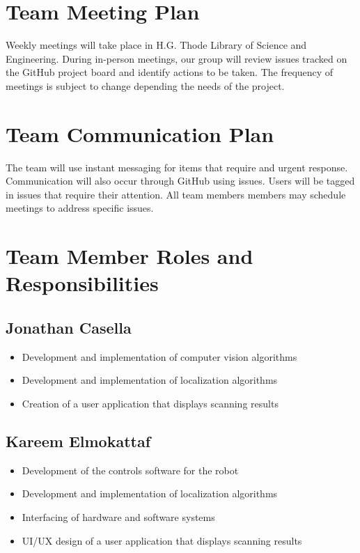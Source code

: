 \documentclass[titlepage]{article}
\begin{document}
\section{Team Meeting Plan}

Weekly meetings will take place in H.G. Thode Library of Science and Engineering. During in-person meetings, our group will review issues tracked on the GitHub project board and identify actions to be taken. The frequency of meetings is subject to change depending the needs of the project. 

\section{Team Communication Plan}

The team will use instant messaging for items that require and urgent response. Communication will also occur through GitHub using issues. Users will be tagged in issues that require their attention. All team members members may schedule  meetings to address specific issues. 

\section{Team Member Roles and Responsibilities}

\subsection{Jonathan Casella}
\begin{itemize}
\item Development and implementation of computer vision algorithms
\item Development and implementation of localization algorithms
\item Creation of a user application that displays scanning results
\end{itemize}

\subsection{Kareem Elmokattaf}
\begin{itemize}
\item Development of the controls software for the robot
\item Development and implementation of localization algorithms
\item Interfacing of hardware and software systems
\item UI/UX design of a user application that displays scanning results
\end{itemize}
\end{document}
